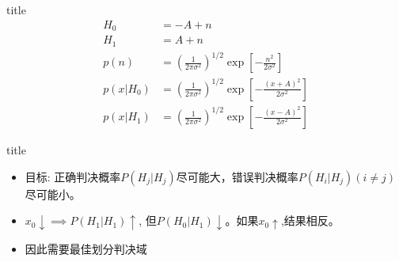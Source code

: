 \begin{frame}{title}
\begin{align*}
H_0&=-A+n\\
H_1&=A+n\\
p(n)&=\left(\frac{1}{2\pi\sigma^2}\right)^{1/2}\exp\left[-\frac{n^2}{2\sigma^2}\right]\\
p(x|H_0)&=\left(\frac{1}{2\pi\sigma^2}\right)^{1/2}\exp\left[-\frac{(x+A)^2}{2\sigma^2}\right]\\
p(x|H_1)&=\left(\frac{1}{2\pi\sigma^2}\right)^{1/2}\exp\left[-\frac{(x-A)^2}{2\sigma^2}\right]
\end{align*}
\end{frame}

\begin{frame}{title}
\begin{itemize}
	\item 目标: 正确判决概率$P(H_j|H_j)$尽可能大，错误判决概率$P(H_i|H_j)(i\ne j)$尽可能小。
	\item $x_0\downarrow\implies P(H_1|H_1)\uparrow$, 但$P(H_0|H_1)\downarrow$。如果$x_0\uparrow$,结果相反。
	\item 因此需要最佳划分判决域
\end{itemize}
\end{frame}




